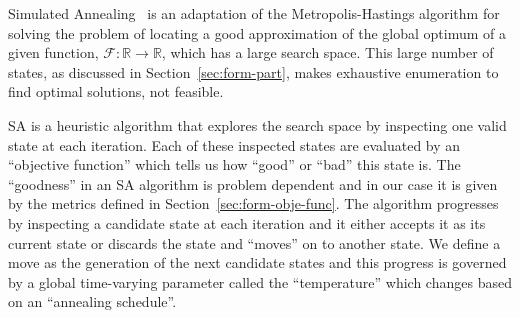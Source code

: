 \begin{scriptsize}
\begin{algorithm}[ht!]
\end{algorithm}
\end{scriptsize}

Simulated Annealing~\cite{kirkpatrick1983optimization} is an adaptation of the Metropolis-Hastings algorithm for solving the problem of locating a good approximation of the global optimum of a given
function, $\mathcal{F}: \mathbb{R} \rightarrow \mathbb{R}$, which has a
large search space. This large number of states, as discussed in Section~\ref{sec:form-part}, makes exhaustive enumeration to find optimal solutions, not feasible.

SA is a heuristic algorithm that explores the search space by inspecting one valid state at each iteration. Each of these inspected states are evaluated by an ``objective function'' which tells us how ``good'' or ``bad'' this state is. The ``goodness'' in an SA algorithm is problem dependent and in our case it is given by the metrics defined in Section~\ref{sec:form-obje-func}. The algorithm progresses by inspecting a candidate state at each iteration and it either accepts it as its current state or discards the state and ``moves'' on to another state. We define a move as the generation of the next candidate states and this progress is governed by a global time-varying parameter called the ``temperature'' which changes based on an ``annealing schedule''.

